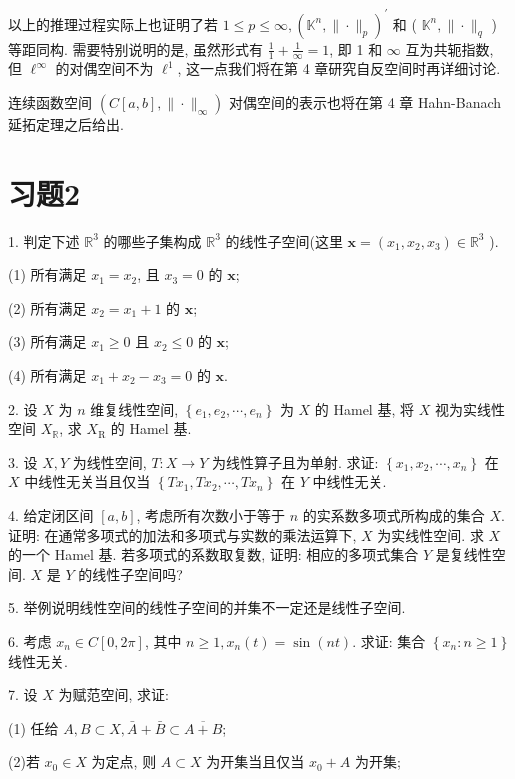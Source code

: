 \documentclass[openany]{ctexbook}
\theoremstyle{kaiti}
\theoremstyle{normal}
\begin{document}
以上的推理过程实际上也证明了若 $1 \leqslant p \leqslant \infty,\left(\mathbb{K}^n,\|\cdot\|_{p}\right)^{\prime}$ 和 ( $\mathbb{K}^n,\|\cdot\|_{q}$ ) 等距同构. 需要特别说明的是, 虽然形式有 $\frac{1}{1}+\frac{1}{\infty}=1$, 即 1 和 $\infty$ 互为共轭指数, 但 $\ell^{\infty}$ 的对偶空间不为 $\ell^1$, 这一点我们将在第 4 章研究自反空间时再详细讨论.

连续函数空间 $\left(C[a, b],\|\cdot\|_{\infty}\right)$ 对偶空间的表示也将在第 4 章 Hahn-Banach 延拓定理之后给出.

\section*{习题2}

1. 判定下述 $\mathbb{R}^3$ 的哪些子集构成 $\mathbb{R}^3$ 的线性子空间(这里 $\boldsymbol{x}=\left(x_1, x_2, x_3\right) \in \mathbb{R}^3$ ).

(1) 所有满足 $x_1=x_2$, 且 $x_3=0$ 的 $\boldsymbol{x}$;

(2) 所有满足 $x_2=x_1+1$ 的 $\boldsymbol{x}$;

(3) 所有满足 $x_1 \geqslant 0$ 且 $x_2 \leqslant 0$ 的 $\boldsymbol{x}$;

(4) 所有满足 $x_1+x_2-x_3=0$ 的 $\boldsymbol{x}$.

2. 设 $X$ 为 $n$ 维复线性空间, $\left\{e_1, e_2, \cdots, e_n\right\}$ 为 $X$ 的 Hamel 基, 将 $X$ 视为实线性空间 $X_{\mathbb{R}}$, 求 $X_{\mathrm{R}}$ 的 Hamel 基.

3. 设 $X, Y$ 为线性空间, $T: X \rightarrow Y$ 为线性算子且为单射. 求证: $\left\{x_1, x_2, \cdots, x_n\right\}$ 在 $X$ 中线性无关当且仅当 $\left\{T x_1, T x_2, \cdots, T x_n\right\}$ 在 $Y$ 中线性无关.

4. 给定闭区间 $[a, b]$, 考虑所有次数小于等于 $n$ 的实系数多项式所构成的集合 $X$. 证明: 在通常多项式的加法和多项式与实数的乘法运算下, $X$ 为实线性空间. 求 $X$ 的一个 Hamel 基. 若多项式的系数取复数, 证明: 相应的多项式集合 $Y$ 是复线性空间. $X$ 是 $Y$ 的线性子空间吗?

5. 举例说明线性空间的线性子空间的并集不一定还是线性子空间.

6. 考虑 $x_n \in C[0,2 \pi]$, 其中 $n \geqslant 1, x_n(t)=\sin (n t)$. 求证: 集合 $\left\{x_n: n \geqslant 1\right\}$ 线性无关.

7. 设 $X$ 为赋范空间, 求证:

(1) 任给 $A, B \subset X, \bar{A}+\bar{B} \subset \overline{A+B}$;

(2)若 $x_0 \in X$ 为定点, 则 $A \subset X$ 为开集当且仅当 $x_0+A$ 为开集;
\end{document}
